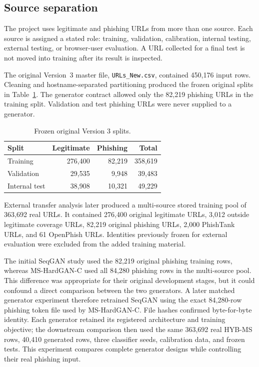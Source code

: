 \subsection{Source separation}

The project uses legitimate and phishing URLs from more than one source. Each
source is assigned a stated role: training, validation, calibration, internal
testing, external testing, or browser-user evaluation. A URL collected for a
final test is not moved into training after its result is inspected.

The original Version~3 master file, \texttt{URLs\_New.csv}, contained 450,176
input rows. Cleaning and hostname-separated partitioning produced the frozen
original splits in Table~\ref{tab:method-v3-splits}. The generator contract
allowed only the 82,219 phishing URLs in the training split. Validation and
test phishing URLs were never supplied to a generator.

\begin{table}[htbp]
\centering
\caption{Frozen original Version 3 splits.}
\label{tab:method-v3-splits}
\begin{tabular}{@{}lrrr@{}}
\toprule
Split & Legitimate & Phishing & Total \\
\midrule
Training   & 276,400 & 82,219 & 358,619 \\
Validation & 29,535  & 9,948  & 39,483 \\
Internal test & 38,908 & 10,321 & 49,229 \\
\bottomrule
\end{tabular}
\end{table}

External transfer analysis later produced a multi-source stored training pool
of 363,692 real URLs. It contained 276,400 original legitimate URLs, 3,012
outside legitimate coverage URLs, 82,219 original phishing URLs, 2,000
PhishTank URLs, and 61 OpenPhish URLs. Identities previously frozen for external
evaluation were excluded from the added training material.

The initial SeqGAN study used the 82,219 original phishing training rows,
whereas MS-HardGAN-C used all 84,280 phishing rows in the multi-source pool.
This difference was appropriate for their original development stages, but it
could confound a direct comparison between the two generators. A later matched
generator experiment therefore retrained SeqGAN using the exact 84,280-row
phishing token file used by MS-HardGAN-C. File hashes confirmed byte-for-byte
identity. Each generator retained its registered architecture and training
objective; the downstream comparison then used the same 363,692 real HYB-MS
rows, 40,410 generated rows, three classifier seeds, calibration data, and
frozen tests. This experiment compares complete generator designs while
controlling their real phishing input.

